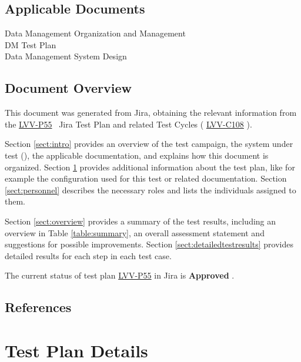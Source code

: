\documentclass[DM,lsstdraft,STR,toc]{lsstdoc}
\begin{document}
\subsection{Applicable Documents}\label{applicable-documents}

 Data Management Organization and Management\\
 DM Test Plan\\
 Data Management System Design


\subsection{Document Overview}
\label{sect:docoverview}

This document was generated from Jira, obtaining the relevant information from the
\href{https://jira.lsstcorp.org/secure/Tests.jspa\#/testPlan/LVV-P55}{LVV-P55}
~Jira Test Plan and related Test Cycles (
\href{https://jira.lsstcorp.org/secure/Tests.jspa\#/testCycle/LVV-C108}{LVV-C108}
).

Section \ref{sect:intro} provides an overview of the test campaign, the system under test (\product{}),
the applicable documentation, and explains how this document is organized.
Section \ref{sect:testplan} provides additional information about the test plan, like for example the configuration
used for this test or related documentation.
Section \ref{sect:personnel} describes the necessary roles and lists the individuals assigned to them.

Section \ref{sect:overview} provides a summary of the test results, including an overview in Table \ref{table:summary},
an overall assessment statement and suggestions for possible improvements.
Section \ref{sect:detailedtestresults} provides detailed results for each step in each test case.

The current status of test plan \href{https://jira.lsstcorp.org/secure/Tests.jspa\#/testPlan/LVV-P55}{LVV-P55} in Jira is \textbf{ Approved }.

\subsection{References}
\label{sect:references}
\renewcommand{\refname}{}



\newpage
\section{Test Plan Details}
\label{sect:testplan}
\end{document}

